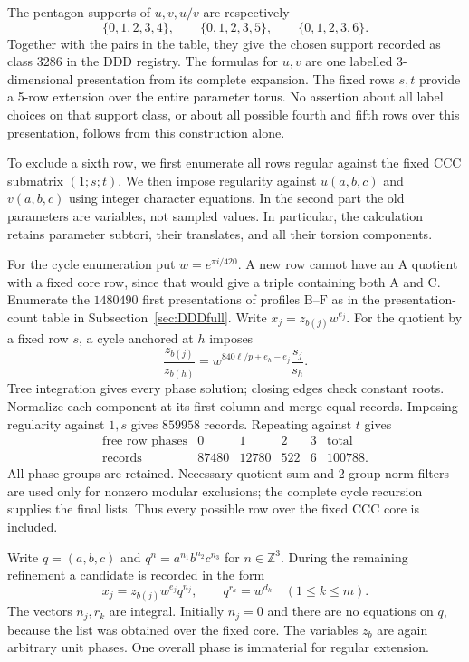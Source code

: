 \documentclass[11pt,a4paper]{article}
\theoremstyle{plain}
\theoremstyle{definition}
\theoremstyle{plain}
\begin{document}
The pentagon supports of $u,v,u/v$ are respectively
$$\{0,1,2,3,4\},\qquad\{0,1,2,3,5\},\qquad\{0,1,2,3,6\}.$$
Together with the pairs in the table, they give the chosen support recorded as class $3286$ in the $\mathrm{DDD}$ registry. The formulas for $u,v$ are one labelled 3-dimensional presentation from its complete expansion. The fixed rows $s,t$ provide a 5-row extension over the entire parameter torus. No assertion about all label choices on that support class, or about all possible fourth and fifth rows over this presentation, follows from this construction alone.

To exclude a sixth row, we first enumerate all rows regular against the fixed $\mathrm{CCC}$ submatrix $(1;s;t)$. We then impose regularity against $u(a,b,c)$ and $v(a,b,c)$ using integer character equations. In the second part the old parameters are variables, not sampled values. In particular, the calculation retains parameter subtori, their translates, and all their torsion components.

\medskip

For the cycle enumeration put $w=e^{\pi i/420}$. A new row cannot have an $\mathrm{A}$ quotient with a fixed core row, since that would give a triple containing both $\mathrm{A}$ and $\mathrm{C}$. Enumerate the $1480490$ first presentations of profiles $\mathrm{B}$--$\mathrm{F}$ as in the presentation-count table in Subsection~\ref{sec:DDDfull}. Write $x_j=z_{b(j)}w^{e_j}$. For the quotient by a fixed row $s$, a cycle anchored at $h$ imposes
\[
\frac{z_{b(j)}}{z_{b(h)}}=w^{840\ell/p+e_h-e_j}\frac{s_j}{s_h}.
\]
Tree integration gives every phase solution; closing edges check constant roots. Normalize each component at its first column and merge equal records. Imposing regularity against $1,s$ gives $859958$ records. Repeating against $t$ gives
\[
\begin{array}{c|rrrr|r}
\text{free row phases}&0&1&2&3&\text{total}\\\hline
\text{records}&87480&12780&522&6&100788.
\end{array}
\]
All phase groups are retained. Necessary quotient-sum and 2-group norm filters are used only for nonzero modular exclusions; the complete cycle recursion supplies the final lists. Thus every possible row over the fixed $\mathrm{CCC}$ core is included.

\medskip
Write $q=(a,b,c)$ and $q^n=a^{n_1}b^{n_2}c^{n_3}$ for $n\in\mathbb Z^3$. During the remaining refinement a candidate is recorded in the form
\[
x_j=z_{b(j)}w^{e_j}q^{n_j},\qquad
q^{r_k}=w^{d_k}\quad(1\le k\le m).
\]
The vectors $n_j,r_k$ are integral. Initially $n_j=0$ and there are no equations on $q$, because the list was obtained over the fixed core. The variables $z_b$ are again arbitrary unit phases. One overall phase is immaterial for regular extension.
\end{document}
